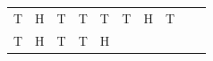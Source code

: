{\begin{tabular}[t]{|l|l|l|l|l|l|l|l|l|l|}
        T &
        H &
        T &
        T &
        T &
        T &
        H &
        T%
     \tabularnewline\cline{1-1}\cline{2-2}\cline{3-3}\cline{4-4}\cline{5-5}\cline{6-6}\cline{7-7}\cline{8-8}\cline{9-9}\cline{10-10}
        T &
        H &
        T &
        T &
        H &

\end{tabular}}
